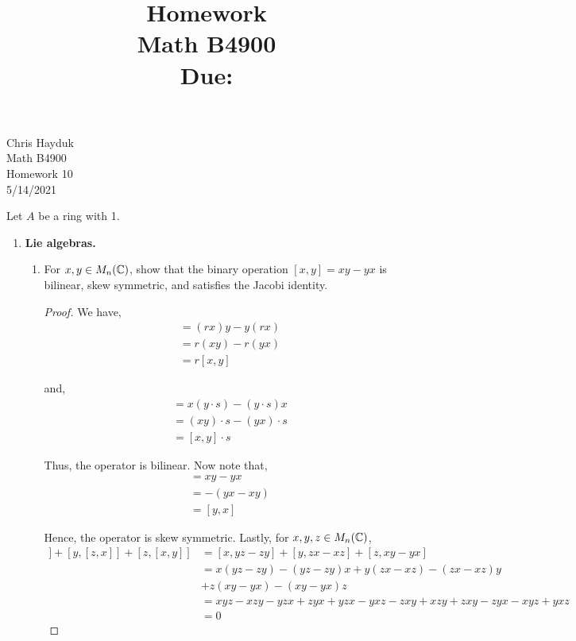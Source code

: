 \documentclass[11pt, reqno]{amsart}
\title[Homework \HW]{Homework \HW \\
Math B4900\\
\small Due: \DUE}
\author{}
\theoremstyle{plain}
\theoremstyle{definition}
\theoremstyle{example}
\def\HW{10}
\def\DUE{5/14/2021}
\begin{document}
\begin{flushright}
Chris Hayduk\\
Math B4900\\
Homework \HW\\
\DUE
\end{flushright}


Let $A$ be a ring with 1.
\begin{enumerate}[I ]
\item \textbf{Lie algebras.}
\begin{enumerate}[1.]
 \item For $x, y \in M_n(\mathbb{C})$, show that the binary operation $[x,y] = xy - yx$ is bilinear, skew symmetric, and satisfies the Jacobi identity. 
 
 \begin{proof}
 We have,
 \begin{align*}
 [rx,y] &= (rx)y - y(rx)\\
 &= r(xy) - r(yx)\\
 &= r[x,y]
 \end{align*}
 
 and,
 \begin{align*}
 [x,y \cdot s] &= x(y \cdot s) - (y \cdot s)x\\
 &= (xy) \cdot s - (yx) \cdot s\\
 &= [x,y] \cdot s
 \end{align*}
 
 Thus, the operator is bilinear. Now note that,
 \begin{align*}
 [x, y] &= xy - yx\\
 &= - (yx - xy)\\
 &= [y, x]
 \end{align*}
 
 Hence, the operator is skew symmetric. Lastly, for $x, y, z \in M_n(\mathbb{C})$,
 \begin{align*}
 [x, [y,z]] + [y, [z,x]] + [z, [x,y]] &= [x, yz - zy] + [y, zx - xz] + [z, xy - yx]\\
 &= x(yz-zy) - (yz-zy)x + y(zx-xz) - (zx-xz)y\\
 &+ z(xy-yx) - (xy-yx)z\\
 &= xyz - xzy - yzx + zyx + yzx - yxz - zxy + xzy + zxy - zyx - xyz + yxz\\
 &= 0
 \end{align*}
 

\end{proof}
\end{enumerate}
\end{enumerate}
\end{document}
